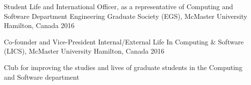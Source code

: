 

\begin{cventries}

  \cventry
    {Student Life and International Officer, as a representative of Computing and Software Department} %
    {Engineering Graduate Society (EGS), McMaster University} %
    {Hamilton, Canada} %
    {2016} %
    {}

  \cventry
    {Co-founder and Vice-President Internal/External} %
    {Life In Computing \& Software (LICS), McMaster University} %
    {Hamilton, Canada} %
    {2016} %
    {
      \begin{cvitems} %
        \item {Club for improving the studies and lives of graduate students in the Computing and Software department}
      \end{cvitems}
    }



\end{cventries}
